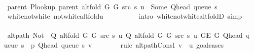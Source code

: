 \begin{isabellebody}
\ \ \ \ \isamarkupfalse%
\ {\isacharminus}{\kern0pt}\isanewline
\ \ \ \ \ \ \isamarkupfalse%
\ parent{\isacharcolon}{\kern0pt}\ {\isachardoublequoteopen}P{\isacharunderscore}{\kern0pt}lookup\ {\isacharparenleft}{\kern0pt}parent\ {\isacharparenleft}{\kern0pt}alt{\isacharunderscore}{\kern0pt}fold\ G{}\ G{}\ src\ s{\isacharparenright}{\kern0pt}{\isacharparenright}{\kern0pt}\ u\ {\isacharequal}{\kern0pt}\ Some\ {\isacharparenleft}{\kern0pt}Q{\isacharunderscore}{\kern0pt}head\ {\isacharparenleft}{\kern0pt}queue\ s{\isacharparenright}{\kern0pt}{\isacharparenright}{\kern0pt}{\isachardoublequoteclose}\isanewline
\ \ \ \ \ \ \ \ \isamarkupfalse%
\ white{\isacharunderscore}{\kern0pt}not{\isacharunderscore}{\kern0pt}white\ not{\isacharunderscore}{\kern0pt}white{\isacharunderscore}{\kern0pt}alt{\isacharunderscore}{\kern0pt}fold{\isacharunderscore}{\kern0pt}u\isanewline
\ \ \ \ \ \ \ \ \isamarkupfalse%
\ {\isacharparenleft}{\kern0pt}intro\ white{\isacharunderscore}{\kern0pt}not{\isacharunderscore}{\kern0pt}white{\isacharunderscore}{\kern0pt}alt{\isacharunderscore}{\kern0pt}foldD{\isacharparenleft}{\kern0pt}{}{\isacharparenright}{\kern0pt}{\isacharparenright}{\kern0pt}\ simp\isanewline
\isanewline
\ \ \ \ \ \ \isamarkupfalse%
\ {\isachardoublequoteopen}alt{\isacharunderscore}{\kern0pt}path\ {\isacharparenleft}{\kern0pt}Not\ {\isasymcirc}\ Q\ {\isacharparenleft}{\kern0pt}alt{\isacharunderscore}{\kern0pt}fold\ G{}\ G{}\ src\ s{\isacharparenright}{\kern0pt}\ u{\isacharparenright}{\kern0pt}\ {\isacharparenleft}{\kern0pt}Q\ {\isacharparenleft}{\kern0pt}alt{\isacharunderscore}{\kern0pt}fold\ G{}\ G{}\ src\ s{\isacharparenright}{\kern0pt}\ u{\isacharparenright}{\kern0pt}\ {\isacharparenleft}{\kern0pt}G{\isachardot}{\kern0pt}E\ G{\isacharparenright}{\kern0pt}\ {\isacharparenleft}{\kern0pt}Q{\isacharunderscore}{\kern0pt}head\ {\isacharparenleft}{\kern0pt}queue\ s{\isacharparenright}{\kern0pt}\ {\isacharhash}{\kern0pt}\ p{\isacharparenright}{\kern0pt}\ {\isacharparenleft}{\kern0pt}Q{\isacharunderscore}{\kern0pt}head\ {\isacharparenleft}{\kern0pt}queue\ s{\isacharparenright}{\kern0pt}{\isacharparenright}{\kern0pt}\ v{\isachardoublequoteclose}\isanewline
\ \ \ \ \ \ \isamarkupfalse%
\ {\isacharparenleft}{\kern0pt}rule\ alt{\isacharunderscore}{\kern0pt}path{\isacharunderscore}{\kern0pt}ConsI{\isacharbrackleft}{\kern0pt}\ {\isacharquery}{\kern0pt}v\ {\isacharequal}{\kern0pt}\ u{\isacharbrackright}{\kern0pt}{\isacharcomma}{\kern0pt}\ goal{\isacharunderscore}{\kern0pt}cases{\isacharparenright}{\kern0pt}\isanewline

\end{isabellebody}

